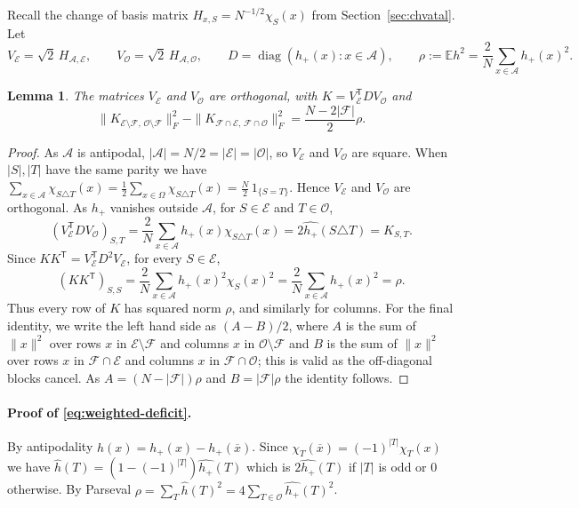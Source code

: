 \documentclass{article}
\theoremstyle{plain}
\newtheorem{lemma}[theo]{Lemma}
\theoremstyle{definition}
\newcommand{\mc}[1]{\mathcal{#1}}
\newcommand{\mb}[1]{\mathbb{#1}}
\newcommand{\sm}{\setminus}
\newcommand{\ov}{\overline}
\newcommand{\OO}{\Omega}
\begin{document}
Recall the change of basis matrix $H_{x,S} = N^{-1/2} \chi_S(x)$ from Section~\ref{sec:chvatal}. Let
\[
 V_{\mc E}=\sqrt2\,H_{\mc A,\mc E},\qquad
 V_{\mc O}=\sqrt2\,H_{\mc A,\mc O},\qquad
 D=\operatorname{diag}(h_+(x):x\in\mc A),\qquad
 \rho:=\mb E h^2=\frac2N\sum_{x\in\mc A}h_+(x)^2.
\]

\begin{lemma}\label{lem:weighted-matrix}
The matrices $V_{\mc E}$ and $V_{\mc O}$ are orthogonal, with
\(
 K=V_{\mc E}^{\mathsf T}DV_{\mc O}
\) and
\[
 \|K_{\mc E\sm\mc F,\,\mc O\sm\mc F}\|_F^2
 -\|K_{\mc F\cap\mc E,\,\mc F\cap\mc O}\|_F^2
 =\frac{N-2|\mc F|}{2}\rho.
\]
\end{lemma}

\begin{proof}
As $\mc A$ is antipodal, $|\mc A|=N/2=|\mc E|=|\mc O|$, so $V_{\mc E}$ and $V_{\mc O}$ are square.  When $|S|,|T|$ have the same parity
we have $\sum_{x\in\mc A}\chi_{S\triangle T}(x)
 =\frac12\sum_{x\in\OO}\chi_{S\triangle T}(x)
 =\frac N2\,1_{\{S=T\}}$. Hence $V_{\mc E}$ and $V_{\mc O}$ are orthogonal.  As $h_+$ vanishes outside $\mc A$, for $S\in\mc E$ and $T\in\mc O$,
\[
 (V_{\mc E}^{\mathsf T}DV_{\mc O})_{S,T}
 =\frac2N\sum_{x\in\mc A}h_+(x)\chi_{S\triangle T}(x)
 =2\widehat{h_+}(S\triangle T)=K_{S,T}.
\]
Since $KK^{\mathsf T}=V_{\mc E}^{\mathsf T}D^2V_{\mc E}$, for every $S\in\mc E$,
\[
 (KK^{\mathsf T})_{S,S}
 =\frac2N\sum_{x\in\mc A}h_+(x)^2\chi_S(x)^2
 =\frac2N\sum_{x\in\mc A}h_+(x)^2=\rho.
\]
Thus every row of $K$ has squared norm $\rho$, and similarly for columns.
For the final identity, we write the left hand side as $(A-B)/2$,
where $A$ is the sum of $\|x\|^2$ over rows $x$ in $\mc E\sm\mc F$ and columns $x$ in $\mc O\sm\mc F$
and $B$ is the sum of $\|x\|^2$ over rows $x$ in $\mc F\cap\mc E$ and columns $x$ in $\mc F\cap\mc O$;
this is valid as the off-diagonal blocks cancel. As $A=(N-|\mc F|)\rho$ and $B=|\mc F|\rho$ the identity follows.
\end{proof}

\paragraph{Proof of \eqref{eq:weighted-deficit}.}
By antipodality $h(x)=h_+(x)-h_+(\ov x)$.  Since
$\chi_T(\ov x)=(-1)^{|T|}\chi_T(x)$ we have
 $\widehat h(T)=(1-(-1)^{|T|})\widehat{h_+}(T)$
which is  $2\widehat{h_+}(T)$ if $|T|$ is odd or $0$ otherwise.
By Parseval  $\rho=\sum_T\widehat h(T)^2
 =4\sum_{T\in\mc O}\widehat{h_+}(T)^2$.
\end{document}
